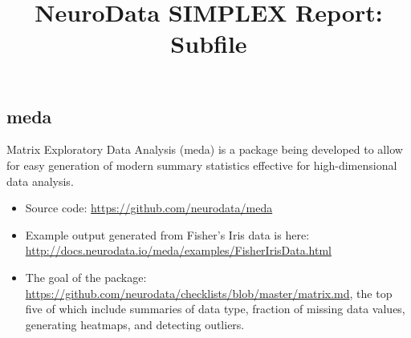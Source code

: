 \documentclass[simplex.tex]{subfiles}
\title{NeuroData SIMPLEX Report: Subfile}
\begin{document}


\subsection{meda}

Matrix Exploratory Data Analysis (meda) is a package being developed to
allow for easy generation of modern summary statistics effective for
high-dimensional data analysis. 

\begin{itemize}
  \item Source code: \href{https://github.com/neurodata/meda}{https://github.com/neurodata/meda}
  \item Example output generated from Fisher's Iris data is here:
    \href{http://docs.neurodata.io/meda}{http://docs.neurodata.io/meda/examples/FisherIrisData.html}
  \item The goal of the package:
    \href{https://github.com/neurodata/checklists/blob/master/matrix.md}{https://github.com/neurodata/checklists/blob/master/matrix.md}, the top five of which include summaries of data type, fraction of missing data values, generating heatmaps, and detecting outliers.
\end{itemize}
\end{document}
